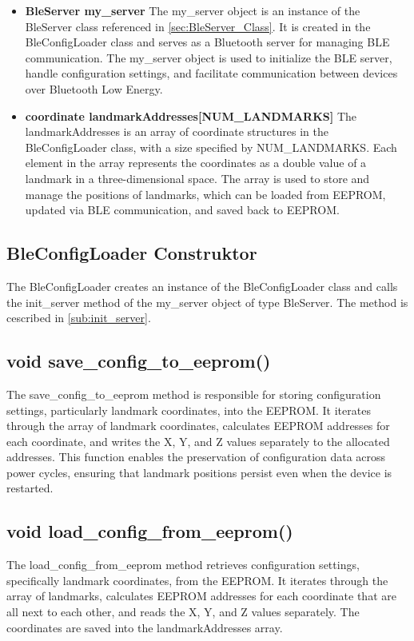 \begin{itemize}
	\item \textbf{BleServer my\_server}
	\newline
	The my\_server object is an instance of the BleServer class referenced in \ref{sec:BleServer_Class}. 
	It is created in the BleConfigLoader class and serves as a Bluetooth server for managing BLE communication. 
	The my\_server object is used to initialize the BLE server, handle configuration settings, and facilitate communication between devices over Bluetooth Low Energy.
	
	\item \textbf{coordinate landmarkAddresses[NUM\_LANDMARKS]}
	\newline
	The landmarkAddresses is an array of coordinate structures in the BleConfigLoader class, with a size specified by NUM\_LANDMARKS. 
	Each element in the array represents the coordinates as a double value of a landmark in a three-dimensional space. 
	The array is used to store and manage the positions of landmarks, which can be loaded from EEPROM, updated via BLE communication, and saved back to EEPROM. 
	
\end{itemize}

\subsection{BleConfigLoader Construktor}
\label{sub:BleConfigLoader_Konstruktor}
The BleConfigLoader creates an instance of the BleConfigLoader class and calls the init\_server method of the my\_server object of type BleServer. 
The method is cescribed in \ref{sub:init_server}. 

\subsection{void save\_config\_to\_eeprom()}
\label{sub:save_config_to_eeprom}
The save\_config\_to\_eeprom method is responsible for storing configuration settings, particularly landmark coordinates, into the EEPROM. 
It iterates through the array of landmark coordinates, calculates EEPROM addresses for each coordinate, and writes the X, Y, and Z values separately to the allocated addresses. 
This function enables the preservation of configuration data across power cycles, ensuring that landmark positions persist even when the device is restarted.

\subsection{void load\_config\_from\_eeprom()}
\label{sub:load_config_from_eeprom}
The load\_config\_from\_eeprom method retrieves configuration settings, specifically landmark coordinates, from the EEPROM. 
It iterates through the array of landmarks, calculates EEPROM addresses for each coordinate that are all next to each other, and reads the X, Y, and Z values separately. 
The coordinates are saved into the landmarkAddresses array. 

